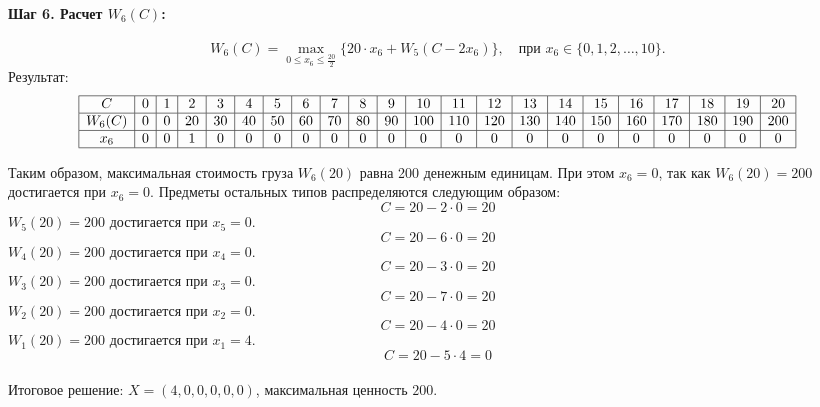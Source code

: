 \documentclass{article}
\begin{document}
\paragraph*{Шаг 6. Расчет $W_6(C)$:}
\[
    W_6(C) = \max_{0 \leq x_6 \leq \frac{20}{2}} \{ 20 \cdot x_6 + W_5(C - 2 x_6) \}, \quad \text{при } x_6 \in \{0, 1, 2, \dots, 10\}.
\]
Результат:
\[
    \begin{array}{|c|c|c|c|c|c|c|c|c|c|c|c|c|c|c|c|c|c|c|c|c|c|}
        \hline
        C      & 0 & 1 & 2  & 3  & 4  & 5  & 6  & 7  & 8  & 9  & 10  & 11  & 12  & 13  & 14  & 15  & 16  & 17  & 18  & 19  & 20  \\
        \hline
        W_6(C) & 0 & 0 & 20 & 30 & 40 & 50 & 60 & 70 & 80 & 90 & 100 & 110 & 120 & 130 & 140 & 150 & 160 & 170 & 180 & 190 & 200 \\
        \hline
        x_6    & 0 & 0 & 1  & 0  & 0  & 0  & 0  & 0  & 0  & 0  & 0   & 0   & 0   & 0   & 0   & 0   & 0   & 0   & 0   & 0   & 0   \\
        \hline
    \end{array}
\]

Таким образом, максимальная стоимость груза $W_6(20)$ равна 200 денежным единицам.
При этом $x_6 = 0$, так как $W_6(20) = 200$ достигается при $x_6=0$.
Предметы остальных типов распределяются следующим образом:
\[
    C = 20 - 2 \cdot 0 = 20
\]
$W_5(20) = 200$ достигается при $x_5 = 0$.
\[
    C = 20 - 6 \cdot 0 = 20
\]
$W_4(20) = 200$ достигается при $x_4 = 0$.
\[
    C = 20 - 3 \cdot 0 = 20
\]
$W_3(20) = 200$ достигается при $x_3 = 0$.
\[
    C = 20 - 7 \cdot 0 = 20
\]
$W_2(20) = 200$ достигается при $x_2 = 0$.
\[
    C = 20 - 4 \cdot 0 = 20
\]
$W_1(20) = 200$ достигается при $x_1 = 4$.
\[
    C = 20 - 5 \cdot 4 = 0
\]\\
Итоговое решение: $X = (4, 0, 0, 0, 0, 0)$, максимальная ценность $200$.
\end{document}
